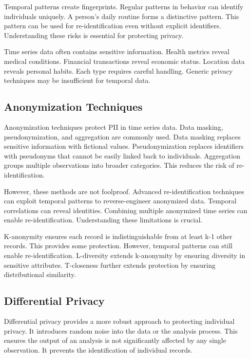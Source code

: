 Temporal patterns create fingerprints. Regular patterns in behavior can identify individuals uniquely. A person's daily routine forms a distinctive pattern. This pattern can be used for re-identification even without explicit identifiers. Understanding these risks is essential for protecting privacy.

Time series data often contains sensitive information. Health metrics reveal medical conditions. Financial transactions reveal economic status. Location data reveals personal habits. Each type requires careful handling. Generic privacy techniques may be insufficient for temporal data.

\subsection{Anonymization Techniques}

Anonymization techniques protect PII in time series data. Data masking, pseudonymization, and aggregation are commonly used. Data masking replaces sensitive information with fictional values. Pseudonymization replaces identifiers with pseudonyms that cannot be easily linked back to individuals. Aggregation groups multiple observations into broader categories. This reduces the risk of re-identification.

However, these methods are not foolproof. Advanced re-identification techniques can exploit temporal patterns to reverse-engineer anonymized data. Temporal correlations can reveal identities. Combining multiple anonymized time series can enable re-identification. Understanding these limitations is crucial.

K-anonymity ensures each record is indistinguishable from at least k-1 other records. This provides some protection. However, temporal patterns can still enable re-identification. L-diversity extends k-anonymity by ensuring diversity in sensitive attributes. T-closeness further extends protection by ensuring distributional similarity.

\subsection{Differential Privacy}

Differential privacy provides a more robust approach to protecting individual privacy. It introduces random noise into the data or the analysis process. This ensures the output of an analysis is not significantly affected by any single observation. It prevents the identification of individual records.

